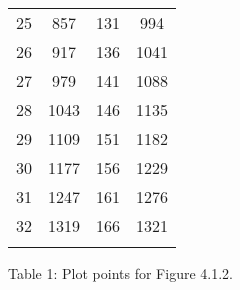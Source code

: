 \begin{center}
\begin{tabular}[.5cm]{ c c c c }
\cmidrule {1-4} 
25 & 857 & 131 & 994 \\ 
\cmidrule {1-4} 
26 & 917 & 136 & 1041 \\ 
\cmidrule {1-4} 
27 & 979 & 141 & 1088 \\ 
\cmidrule {1-4} 
28 & 1043 & 146 & 1135 \\ 
\cmidrule {1-4} 
29 & 1109 & 151 & 1182 \\ 
\cmidrule {1-4} 
30 & 1177 & 156 & 1229 \\ 
\cmidrule {1-4} 
31 & 1247 & 161 & 1276 \\ 
\cmidrule {1-4} 
32 & 1319 & 166 & 1321 \\ 
\bottomrule 
\linebreak 
\end{tabular} 
\linebreak \linebreak Table 1: Plot points for Figure 4.1.2.
\end{center} \hfill 

\pagebreak



